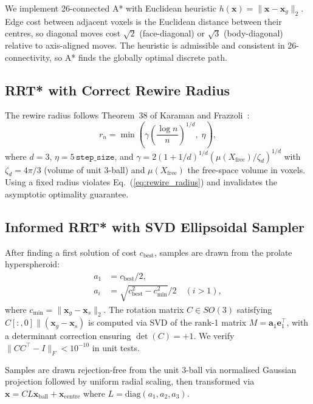 \documentclass[10pt,twocolumn]{article}
\newcommand{\Xfree}{X_{\mathrm{free}}}
\newcommand{\cbest}{c_{\mathrm{best}}}
\newcommand{\cmin}{c_{\mathrm{min}}}
\begin{document}
We implement 26-connected A* with Euclidean heuristic
$h(\mathbf{x}) = \|\mathbf{x} - \mathbf{x}_g\|_2$.
Edge cost between adjacent voxels is the Euclidean distance between
their centres, so diagonal moves cost $\sqrt{2}$ (face-diagonal) or
$\sqrt{3}$ (body-diagonal) relative to axis-aligned moves.
The heuristic is admissible and consistent in 26-connectivity, so A*
finds the globally optimal discrete path.

\subsection{RRT* with Correct Rewire Radius}

The rewire radius follows Theorem~38 of Karaman and Frazzoli~\cite{karaman2011}:
\begin{equation}
  r_n = \min\!\left(\gamma \left(\frac{\log n}{n}\right)^{1/d},\; \eta\right),
  \label{eq:rewire_radius}
\end{equation}
where $d=3$, $\eta = 5\,\texttt{step\_size}$,
and $\gamma = 2(1+1/d)^{1/d}(\mu(\Xfree)/\zeta_d)^{1/d}$
with $\zeta_d = 4\pi/3$ (volume of unit 3-ball) and
$\mu(\Xfree)$ the free-space volume in voxels.
Using a fixed radius violates Eq.~(\ref{eq:rewire_radius}) and
invalidates the asymptotic optimality guarantee.

\subsection{Informed RRT* with SVD Ellipsoidal Sampler}

After finding a first solution of cost $\cbest$, samples are drawn from
the prolate hyperspheroid:
\begin{align}
  a_1 &= \cbest/2, \label{eq:a1} \\
  a_i &= \sqrt{\cbest^2 - \cmin^2}/2 \quad (i > 1), \label{eq:ai}
\end{align}
where $\cmin = \|\mathbf{x}_g - \mathbf{x}_s\|_2$.
The rotation matrix $C \in SO(3)$ satisfying $C[:,0] \parallel
(\mathbf{x}_g - \mathbf{x}_s)$ is computed via SVD of the rank-1
matrix $M = \mathbf{a}_1 \mathbf{e}_1^\top$, with a determinant
correction ensuring $\det(C) = +1$.
We verify $\|CC^\top - I\|_F < 10^{-10}$ in unit tests.

Samples are drawn rejection-free from the unit 3-ball via normalised
Gaussian projection followed by uniform radial scaling, then transformed
via $\mathbf{x} = C L \mathbf{x}_\mathrm{ball} + \mathbf{x}_\mathrm{centre}$
where $L = \mathrm{diag}(a_1, a_2, a_3)$.
\end{document}
